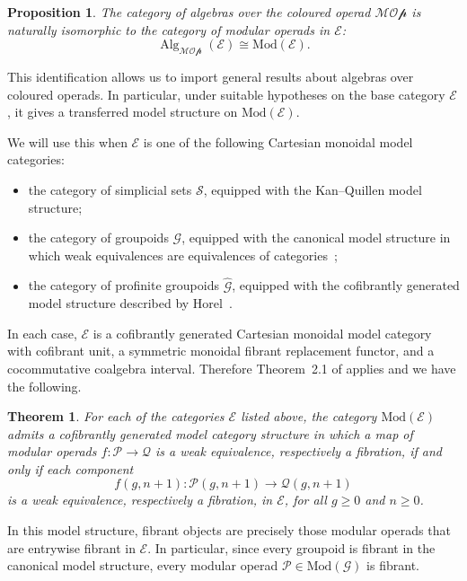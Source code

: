 \documentclass{amsart}
\newcommand{\bE}{\mathscr{E}}
\newcommand{\sSet}{\mathscr{S}}
\newcommand{\Grpd}{\mathscr{G}}
\newcommand{\Mod}{\mathrm{Mod}}
\newcommand{\Alg}{\operatorname{Alg}}
\newtheorem{thm}[theorem]{Theorem}%
\newtheorem{prop}[theorem]{Proposition}%
\theoremstyle{definition}
\numberwithin{equation}{section}
\begin{document}
\begin{prop}\label{prop: modular operads are algebras over operads}
The category of algebras over the coloured operad $\mathcal{MOp}$ is naturally isomorphic to the category of modular operads in $\bE$:
\[
\Alg_{\mathcal{MOp}}(\bE)\cong \Mod(\bE).
\]
\end{prop}

This identification allows us to import general results about algebras over coloured operads. In particular, under suitable hypotheses on the base category $\bE$, it gives a transferred model structure on $\Mod(\bE)$.

We will use this when $\bE$ is one of the following Cartesian monoidal model categories:

\begin{itemize}
  \item the category of simplicial sets $\sSet$, equipped with the Kan--Quillen model structure;
  \item the category of groupoids $\Grpd$, equipped with the canonical model structure in which weak equivalences are equivalences of categories~\cite{And};
  \item the category of profinite groupoids $\widehat{\Grpd}$, equipped with the cofibrantly generated model structure described by Horel~\cite[Theorem~4.12]{Horel_profinite_groupoids}.
\end{itemize}

In each case, $\bE$ is a cofibrantly generated Cartesian monoidal model category with cofibrant unit, a symmetric monoidal fibrant replacement functor, and a cocommutative coalgebra interval. Therefore Theorem~2.1 of \cite{bm_resolutions} applies and we have the following.

\begin{thm}\label{model structure on Mod(E)}
For each of the categories $\bE$ listed above, the category $\Mod(\bE)$ admits a cofibrantly generated model category structure in which a map of modular operads
$f:\mathcal{P}\longrightarrow \mathcal{Q}$  is a weak equivalence, respectively a fibration, if and only if each component
\[
f(g,n+1):\mathcal{P}(g,n+1)\longrightarrow \mathcal{Q}(g,n+1)
\]
is a weak equivalence, respectively a fibration, in $\bE$, for all $g\geq 0$ and $n\geq 0$.
\end{thm}

In this model structure, fibrant objects are precisely those modular operads that are entrywise fibrant in $\bE$. In particular, since every groupoid is fibrant in the canonical model structure, every modular operad $\mathcal{P}\in\Mod(\Grpd)$ is fibrant.
\end{document}
